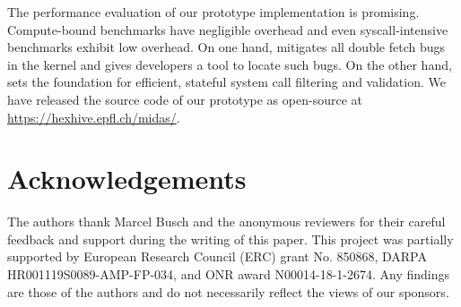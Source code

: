 \documentclass[letterpaper,twocolumn,10pt]{article}
\begin{document}
The performance evaluation of our prototype implementation is promising.
Compute-bound benchmarks have negligible overhead and even syscall-intensive
benchmarks exhibit low overhead. On one hand, \midas mitigates all double fetch
bugs in the kernel and gives developers a tool to locate such bugs. On the other
hand, \midas sets the foundation for efficient, stateful system call filtering
and validation.
%
We have released the source code of our prototype as open-source at
\url{https://hexhive.epfl.ch/midas/}.

\section*{Acknowledgements}
The authors thank Marcel Busch and the anonymous reviewers for their careful
feedback and support during the writing of this
paper.
%
This project was partially supported by European Research Council (ERC)
grant No. 850868, DARPA HR001119S0089-AMP-FP-034, and ONR award
N00014-18-1-2674. Any findings are those of the authors and do not necessarily
reflect the views of our sponsors.


\balance



\end{document}
